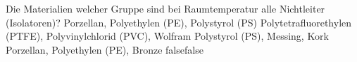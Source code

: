     {Die Materialien welcher Gruppe sind bei Raumtemperatur alle Nichtleiter (Isolatoren)?}
    {Porzellan, Polyethylen (PE), Polystyrol (PS)}
    {Polytetrafluorethylen (PTFE), Polyvinylchlorid (PVC), Wolfram}
    {Polystyrol (PS), Messing, Kork}
    {Porzellan, Polyethylen (PE), Bronze}
    {false}{false}
